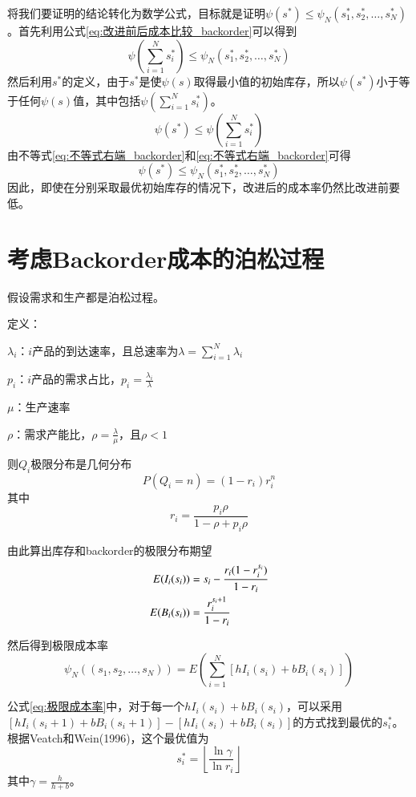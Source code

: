 将我们要证明的结论转化为数学公式，目标就是证明$\psi(s^*)\leq\psi_N(s_1^*,s_2^*,\ldots,s_N^*)$。首先利用公式\ref{eq:改进前后成本比较_backorder}可以得到
\begin{equation}
\psi(\sum_{i=1}^Ns_i^*) \leq \psi_N(s_1^*,s_2^*,\ldots,s_N^*)
\label{eq:不等式右端_backorder}
\end{equation}
然后利用$s^*$的定义，由于$s^*$是使$\psi(s)$取得最小值的初始库存，所以$\psi(s^*)$小于等于任何$\psi(s)$值，其中包括$\psi(\sum_{i=1}^Ns_i^*)$。
\begin{equation}
\psi(s^*) \leq \psi(\sum_{i=1}^Ns_i^*)
\label{eq:不等式右端_backorder}
\end{equation}
由不等式\ref{eq:不等式右端_backorder}和\ref{eq:不等式右端_backorder}可得
\[
\psi(s^*) \leq \psi_N(s_1^*,s_2^*,\ldots,s_N^*)
\]
因此，即使在分别采取最优初始库存的情况下，改进后的成本率仍然比改进前要低。









\section{考虑Backorder成本的泊松过程}

假设需求和生产都是泊松过程。

定义：

$\lambda_i$：$i$产品的到达速率，且总速率为$\lambda=\sum_{i=1}^N\lambda_i$

$p_i$：$i$产品的需求占比，$p_i=\frac{\lambda_i}{\lambda}$

$\mu$：生产速率

$\rho$：需求产能比，$\rho = \frac{\lambda}{\mu}$，且$\rho<1$

则$Q_i$极限分布是几何分布
\[
P(Q_i=n)=(1-r_i)r_i^n
\]
其中
\[
r_i = \frac{p_i\rho}{1-\rho+p_i\rho}
\]

由此算出库存和backorder的极限分布期望
\begin{align}
E(I_i(s_i)) &= s_i - \frac{r_i(1-r_i^{s_i})}{1-r_i} \notag\\
E(B_i(s_i)) &= \frac{r_i^{s_i+1}}{1-r_i} \notag 
\end{align}

然后得到极限成本率
\begin{equation}
\psi_N((s_1,s_2,\ldots,s_N)) = E\left(\sum_{i=1}^N[hI_i(s_i)+bB_i(s_i)]\right)
\label{eq:极限成本率}
\end{equation}

公式\ref{eq:极限成本率}中，对于每一个$hI_i(s_i)+bB_i(s_i)$，可以采用$[hI_i(s_i+1)+bB_i(s_i+1)]-[hI_i(s_i)+bB_i(s_i)]$的方式找到最优的$s_i^*$。根据Veatch和Wein(1996)，这个最优值为
\[
s_i^* = \left\lfloor\frac{\ln\gamma}{\ln r_i}\right\rfloor
\]
其中$\gamma=\frac{h}{h+b}$。

